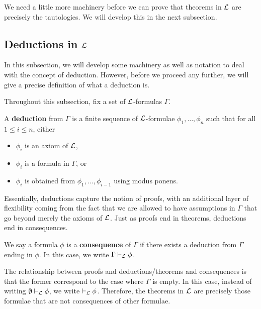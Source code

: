 We need a little more machinery before we can prove that theorems in $\mathcal{L}$ are precisely the tautologies. We will develop this in the next subsection.

\subsection{Deductions in $\mathcal{L}$}

In this subsection, we will develop some machinery as well as notation to deal with the concept of deduction. However, before we proceed any further, we will give a precise definition of what a deduction is.

Throughout this subsection, fix a set of $\mathcal{L}$-formulas $\Gamma$.

\begin{boxdefinition}[Deduction]\label{Ch1:Def:Deduction}
    A \textbf{deduction} from $\Gamma$ is a finite sequence of $\mathcal{L}$-formulae $\phi_1, \ldots, \phi_n$ such that for all $1 \leq i \leq n$, either
    \begin{itemize}%
        \item $\phi_i$ is an axiom of $\mathcal{L}$,
        \item $\phi_i$ is a formula in $\Gamma$, or
        \item $\phi_i$ is obtained from $\phi_1, \ldots, \phi_{i-1}$ using modus ponens.
    \end{itemize}
\end{boxdefinition}

Essentially, deductions capture the notion of proofs, with an additional layer of flexibility coming from the fact that we are allowed to have assumptions in $\Gamma$ that go beyond merely the axioms of $\mathcal{L}$. Just as proofs end in theorems, deductions end in consequences.

\begin{boxdefinition}[Consequence]
    We say a formula $\phi$ is a \textbf{consequence} of $\Gamma$ if there exists a deduction from $\Gamma$ ending in $\phi$. In this case, we write $\Gamma \vdash_{\mathcal{L}} \phi$.
\end{boxdefinition}

The relationship between proofs and deductions/theorems and consequences is that the former correspond to the case where $\Gamma$ is empty. In this case, instead of writing $\emptyset \vdash_{\mathcal{L}} \phi$, we write $\vdash_{\mathcal{L}} \phi$. Therefore, the theorems in $\mathcal{L}$ are precisely those formulae that are not consequences of other formulae.

